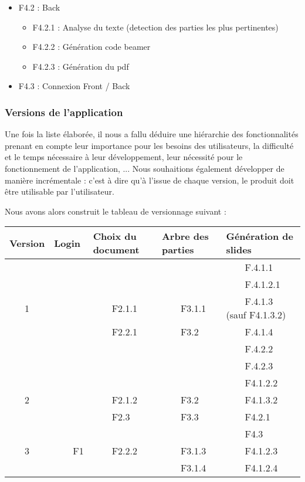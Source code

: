 \documentclass[12pt]{article}
\newcommand{\tabitem}{~~\llap{\textbullet}~~}
\begin{document}
\begin{itemize}
\begin{itemize}
        \item F4.2 : Back
        \begin{itemize}
            \item F4.2.1 : Analyse du texte (detection des parties les plus pertinentes)
            \item F4.2.2 : Génération code beamer
            \item F4.2.3 : Génération du pdf
        \end{itemize}
        \item F4.3 : Connexion Front / Back
    \end{itemize}
\end{itemize}

\subsubsection{Versions de l'application}
\noindent
Une fois la liste élaborée, il nous a fallu déduire une hiérarchie des fonctionnalités prenant en compte leur importance pour les besoins des utilisateurs, la difficulté et le temps nécessaire à leur développement, leur nécessité pour le fonctionnement de l'application, ... Nous souhaitions également développer de manière incrémentale : c'est à dire qu'à l'issue de chaque version, le produit doit être utilisable par l'utilisateur.

\noindent
Nous avons alors construit le tableau de versionnage suivant : 

\noindent
\begin{tabular}{|c|l|l|l|l|}
\hline
Version & Login & Choix du document & Arbre des parties & Génération de slides\\
\hline
&  &  &  & \tabitem F.4.1.1   \\
&  &  &  & \tabitem F.4.1.2.1   \\
1 & & \tabitem F2.1.1 & \tabitem F3.1.1 & \tabitem F.4.1.3 (sauf F4.1.3.2)  \\
&  & \tabitem F2.2.1 & \tabitem F3.2 & \tabitem F.4.1.4  \\
&  &  &  & \tabitem F.4.2.2  \\
&  &  &  & \tabitem F.4.2.3  \\
\hline
&  &  &  & \tabitem F4.1.2.2  \\
2&  & \tabitem F2.1.2 & \tabitem F3.2 & \tabitem F4.1.3.2  \\
&  & \tabitem F2.3 & \tabitem F3.3 & \tabitem F4.2.1 \\
&  &  &  & \tabitem F4.3 \\
\hline

3& \tabitem F1 & \tabitem F2.2.2  & \tabitem F3.1.3 & \tabitem F4.1.2.3  \\
&  &  & \tabitem F3.1.4 & \tabitem F4.1.2.4  \\
\hline

\end{tabular}
\end{document}
